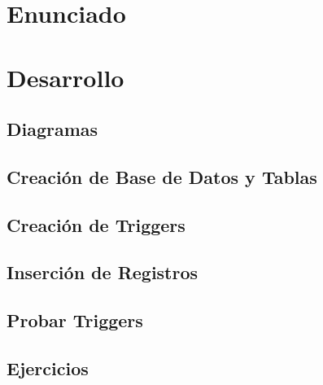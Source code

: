 \documentclass{extbook}
\begin{document}

\tableofcontents
\listoffigures
\chapter{Enunciado}

\chapter{Desarrollo}
\section{Diagramas}

\section{Creación de Base de Datos y Tablas}

\section{Creación de Triggers}

\section{Inserción de Registros}

\section{Probar Triggers}

\section{Ejercicios}

\end{document}
